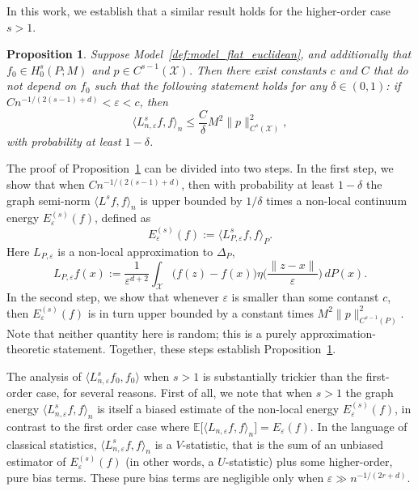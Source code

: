 \documentclass{article}
\newcommand{\1}{\mathbf{1}}
\newcommand{\mc}[1]{\mathcal{#1}}
\newcommand{\Ebb}{\mathbb{E}}
\newcommand{\dotp}[2]{\langle #1, #2 \rangle}
\theoremstyle{alden}
\theoremstyle{aldenthm}
\newtheorem{proposition}{Proposition}
\theoremstyle{definition}
\theoremstyle{remark}
\begin{document}
In this work, we establish that a similar result holds for the higher-order case $s > 1$. 

\begin{proposition}
	\label{prop:graph_seminorm_ho} 
	Suppose Model~\ref{def:model_flat_euclidean}, and additionally that $f_0 \in H_0^s(P;M)$ and $p \in C^{s - 1}(\mc{X})$. Then there exist constants $c$ and $C$ that do not depend on $f_0$ such that the following statement holds for any $\delta \in (0,1)$: if $Cn^{-1/(2(s - 1) + d)} < \varepsilon < c$, then
	\begin{equation}
	\label{eqn:graph_seminorm_ho}
	\dotp{L_{n,\varepsilon}^s f}{f}_n \leq \frac{C}{\delta} M^2 \|p\|_{C^{s}(\mc{X})}^2,
	\end{equation}
	with probability at least $1 - \delta$.
\end{proposition}
The proof of Proposition~\ref{prop:graph_seminorm_ho} can be divided into two steps. In the first step, we show that when $Cn^{-1/(2(s - 1) + d)}$, then with probability at least $1 - \delta$ the graph semi-norm $\dotp{L^s f}{f}_n$ is upper bounded by $1/\delta$ times a non-local continuum energy $E_{\varepsilon}^{(s)}(f)$, defined as
\begin{equation*}
E_{\varepsilon}^{(s)}(f) := \dotp{L_{P,\varepsilon}^sf}{f}_{P}.
\end{equation*}
Here $L_{P,\varepsilon}$ is a non-local approximation to $\Delta_P$, 
\begin{equation}
\label{eqn:nonlocal_laplacian}
L_{P,\varepsilon}f(x) := \frac{1}{\varepsilon^{d + 2}}\int_{\mc{X}}\bigl(f(z) - f(x)\bigr) \eta\biggl(\frac{\|z - x\|}{\varepsilon}\biggr) \,dP(x).
\end{equation}
In the second step, we show that whenever $\varepsilon$  is smaller than some contanst $c$, then $E_{\varepsilon}^{(s)}(f)$ is in turn upper bounded by a constant times $M^2 \|p\|_{C^{s - 1}(P)}^2$. Note that neither quantity here is random; this is a purely approximation-theoretic statement. Together, these steps establish Proposition~\ref{prop:graph_seminorm_ho}.

The analysis of $\dotp{L_{n,\varepsilon}^sf_0}{f_0}$ when $s > 1$ is substantially trickier than the first-order case, for several reasons. First of all, we note that when $s > 1$ the graph energy $\dotp{L_{n,\varepsilon}^s f}{f}_n$ is itself a biased estimate of the non-local energy $E_{\varepsilon}^{(s)}(f)$, in contrast to the first order case where $\Ebb\bigl[\dotp{L_{n,\varepsilon} f}{f}_n\bigr] = E_{\varepsilon}(f)$. In the language of classical statistics, $\dotp{L_{n,\varepsilon}^s f}{f}_n$ is a $V$-statistic, that is the sum of an unbiased estimator of $E_{\varepsilon}^{(s)}(f)$ (in other words, a $U$-statistic) plus some higher-order, pure bias terms. These pure bias terms are negligible only when $\varepsilon \gg n^{-1/(2r + d)}$. 
\end{document}
